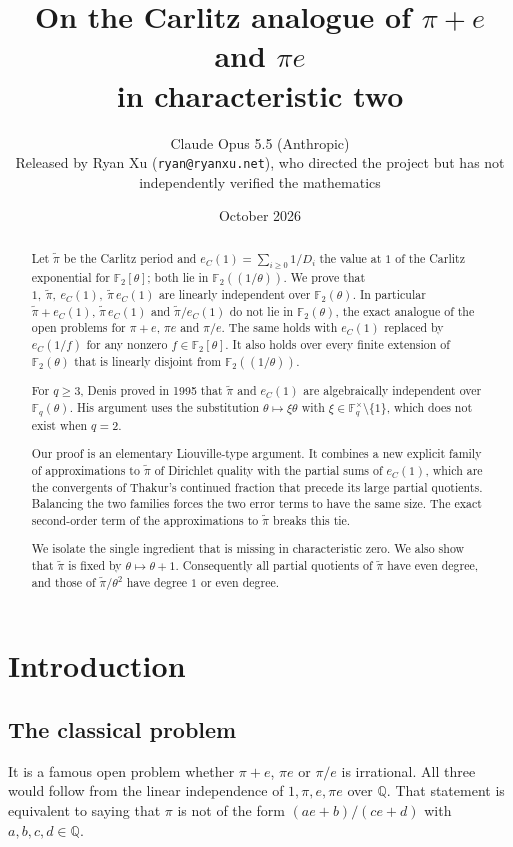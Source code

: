 \documentclass[11pt]{amsart}
\title[The Carlitz analogue of $\pi+e$ in characteristic two]{On the Carlitz analogue of $\pi+e$ and $\pi e$\\ in characteristic two}
\author{Claude Opus 5.5 (Anthropic)\\[4pt] \small Released by Ryan Xu (\texttt{ryan@ryanxu.net}), who directed the project but has not independently verified the mathematics}
\date{October 2026}
\theoremstyle{remark}
\numberwithin{equation}{section}
\newcommand{\F}{\mathbb{F}}
\newcommand{\Q}{\mathbb{Q}}
\newcommand{\pit}{\tilde\pi}
\newcommand{\eC}{e_C}
\begin{document}
\begin{abstract}
Let $\pit$ be the Carlitz period and $\eC(1)=\sum_{i\ge0}1/D_i$ the value at $1$ of the Carlitz exponential for $\F_2[\theta]$; both lie in $\F_2((1/\theta))$. We prove that $1,\ \pit,\ \eC(1),\ \pit\,\eC(1)$ are linearly independent over $\F_2(\theta)$. In particular $\pit+\eC(1)$, $\pit\,\eC(1)$ and $\pit/\eC(1)$ do not lie in $\F_2(\theta)$, the exact analogue of the open problems for $\pi+e$, $\pi e$ and $\pi/e$. The same holds with $\eC(1)$ replaced by $\eC(1/f)$ for any nonzero $f\in\F_2[\theta]$. It also holds over every finite extension of $\F_2(\theta)$ that is linearly disjoint from $\F_2((1/\theta))$.

For $q\ge3$, Denis proved in 1995 that $\pit$ and $\eC(1)$ are algebraically independent over $\F_q(\theta)$. His argument uses the substitution $\theta\mapsto\xi\theta$ with $\xi\in\F_q^\times\setminus\{1\}$, which does not exist when $q=2$.

Our proof is an elementary Liouville-type argument. It combines a new explicit family of approximations to $\pit$ of Dirichlet quality with the partial sums of $\eC(1)$, which are the convergents of Thakur's continued fraction that precede its large partial quotients. Balancing the two families forces the two error terms to have the same size. The exact second-order term of the approximations to $\pit$ breaks this tie.

We isolate the single ingredient that is missing in characteristic zero. We also show that $\pit$ is fixed by $\theta\mapsto\theta+1$. Consequently all partial quotients of $\pit$ have even degree, and those of $\pit/\theta^2$ have degree $1$ or even degree.
\end{abstract}

\maketitle

\section{Introduction}

\subsection{The classical problem}
It is a famous open problem whether $\pi+e$, $\pi e$ or $\pi/e$ is irrational. All three would follow from the linear independence of $1,\pi,e,\pi e$ over $\Q$. That statement is equivalent to saying that $\pi$ is not of the form $(ae+b)/(ce+d)$ with $a,b,c,d\in\Q$.
\end{document}
